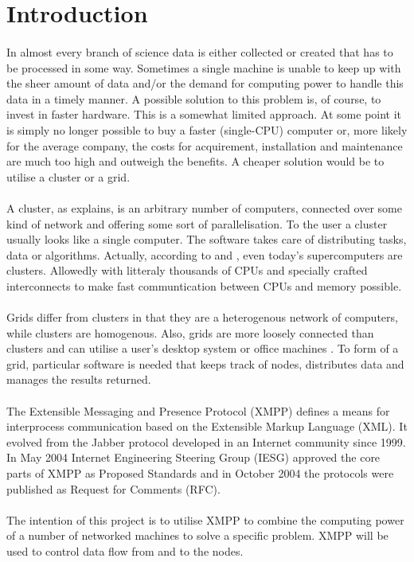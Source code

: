 \section{Introduction}
\paragraph{}
In almost every branch of science data is either collected or created that has to be processed in some way. Sometimes a single machine is unable to keep up with the sheer amount of data and/or the demand for computing power to handle this data in a timely manner. A possible solution to this problem is, of course, to invest in faster hardware. This is a somewhat limited approach. At some point it is simply no longer possible to buy a faster (single-CPU) computer or, more likely for the average company, the costs for acquirement, installation and maintenance are much too high and outweigh the benefits. A cheaper solution would be to utilise a cluster or a grid.
\paragraph{}
A cluster, as  explains, is an arbitrary number of computers, connected over some kind of network and offering some sort of parallelisation. To the user a cluster usually looks like a single computer. The software takes care of distributing tasks, data or algorithms. Actually, according to  and , even today's supercomputers are clusters. Allowedly with litteraly thousands of CPUs and specially crafted interconnects to make fast communtication between CPUs and memory possible.
\paragraph{}
Grids differ from clusters in that they are a heterogenous network of computers, while clusters are homogenous. Also, grids are more loosely connected than clusters and can utilise a user's desktop system or office machines \cite{wikipedia005}. To form of a grid, particular software is needed that keeps track of nodes, distributes data and manages the results returned.
\paragraph{}
The Extensible Messaging and Presence Protocol (XMPP) defines a means for interprocess communication based on the Extensible Markup Language (XML). It evolved from the Jabber protocol developed in an Internet community since 1999. In May 2004 Internet Engineering Steering Group (IESG) approved the core parts of XMPP \cite{xmpp-core,xmpp-im} as Proposed Standards and in October 2004 the protocols were published as Request for Comments (RFC).
\paragraph{}
The intention of this project is to utilise XMPP to combine the computing power of a number of networked machines to solve a specific problem. XMPP will be used to control data flow from and to the nodes.
